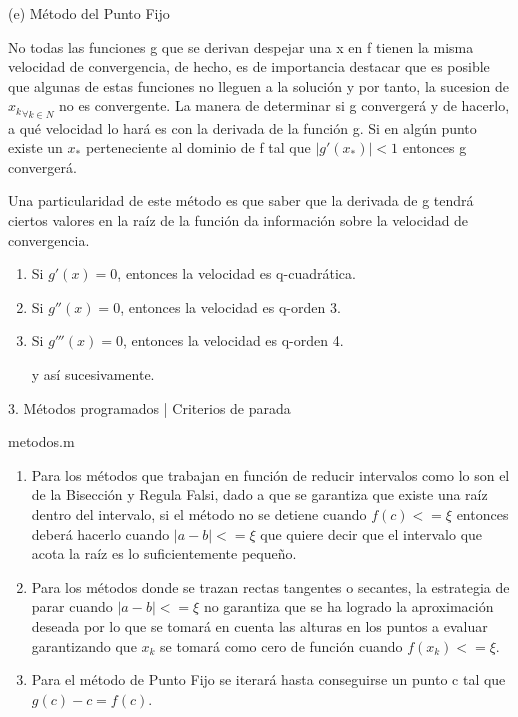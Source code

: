 \documentclass[11pt]{article}
\begin{document}






{\large (e) Método del Punto Fijo}

No todas las funciones g que se derivan despejar una x en f tienen la misma velocidad de convergencia, de hecho, es de importancia destacar que es posible que algunas de estas funciones no lleguen a la solución y por tanto, la sucesion de ${x_k}_{\forall k \in N}$ no es convergente. La manera de determinar si g convergerá y de hacerlo, a qué velocidad lo hará es con la derivada de la función g. Si en algún punto existe un $x_*$ perteneciente al dominio de f tal que $|g'(x_*)|<1 $ entonces g convergerá.

Una particularidad de este método es que saber que la derivada de g tendrá ciertos valores en la raíz de la función da información sobre la velocidad de convergencia. 
\begin{enumerate}
\item[\textendash] Si $g'(x) = 0 $, entonces la velocidad es q-cuadrática. 
\item[\textendash] Si $g''(x) = 0 $, entonces la velocidad es q-orden 3. 
\item[\textendash] Si $g'''(x) = 0 $, entonces la velocidad es q-orden 4. 

y así sucesivamente.
\end{enumerate}
\vspace{1cm}

\begin{center} \Large {3. Métodos programados | Criterios de parada}\end{center}

\begin{tcolorbox}[colframe=blue!35!black, title=Código]
    metodos.m
\end{tcolorbox}

\begin{enumerate}
\item[\textendash] Para los métodos que trabajan en función de reducir intervalos como lo son el de la Bisección y Regula Falsi, dado a que se garantiza que existe una raíz dentro del intervalo, si el método no se detiene cuando $f(c) <= \xi$ entonces deberá hacerlo cuando $|a-b| <= \xi$ que quiere decir que el intervalo que acota la raíz es lo suficientemente pequeño.
\item[\textendash] Para los métodos donde se trazan rectas tangentes o secantes, la estrategia de parar cuando $|a-b| <= \xi$ no garantiza que se ha logrado la aproximación deseada por lo que se tomará en cuenta las alturas en los puntos a evaluar garantizando que $x_k$ se tomará como cero de función cuando $f(x_k) <= \xi$.
\item[\textendash] Para el método de Punto Fijo se iterará hasta conseguirse un punto c tal que $g(c) - c = f(c)$.

\end{enumerate}
\end{document}

